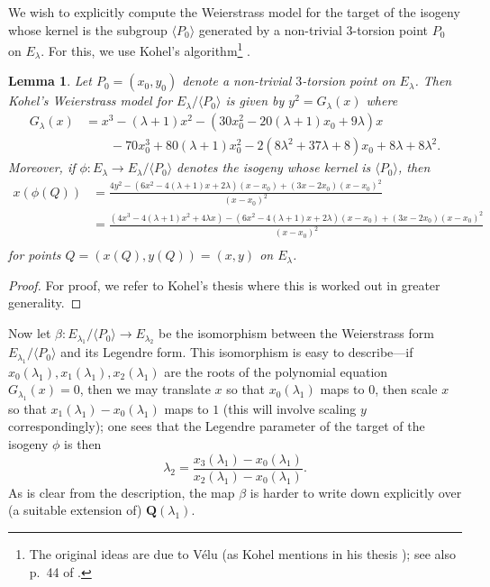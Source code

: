 \documentclass[11pt,a4paper]{article}
\newtheorem{lem}[defn]{Lemma}
\begin{document}
We wish to explicitly compute the Weierstrass model for the target of the isogeny whose kernel is the subgroup $\langle P_0 \rangle$ generated by a non-trivial $3$-torsion point $P_0$ on $E_\lambda$. For this, we use Kohel's algorithm\footnote{The original ideas are due to V\'elu \cite{V71} (as Kohel mentions in his thesis \cite{Koh96}); see also p.~44 of \cite{Elk98}.} \cite{Koh96}.

\begin{lem}
  Let $P_0 = (x_0, y_0)$ denote a non-trivial $3$-torsion point on $E_\lambda$. Then Kohel's Weierstrass model for $E_\lambda/\langle P_0 \rangle$ is given by $y^2 = G_\lambda(x)$ where 
  \begin{align*}
    G_\lambda(x) &= x^3 - (\lambda + 1)x^2 - (30x_0^2 -20(\lambda + 1)x_0 + 9\lambda) x \\
        &\qquad - 70x_0^3 + 80(\lambda + 1)x_0^2 - 2(8\lambda^2 + 37\lambda + 8)x_0 + 8\lambda + 8\lambda^2.
  \end{align*}
  Moreover, if $\phi: E_\lambda \to E_\lambda/\langle P_0 \rangle$ denotes the isogeny whose kernel is $\langle P_0 \rangle$, then
  \begin{align*}
    x(\phi(Q)) &= \frac{4y^2-(6x^2 - 4 (\lambda + 1)x + 2\lambda)(x-x_0) + (3x -2x_0)(x-x_0)^2}{(x-x_0)^2} \\
               &= \frac{(4x^3 - 4 (\lambda + 1) x^2 + 4 \lambda x)-(6x^2 - 4 (\lambda + 1)x + 2\lambda)(x-x_0) + (3x -2x_0)(x-x_0)^2}{(x-x_0)^2} \\
  \end{align*}
  for points $Q = (x(Q), y(Q)) = (x, y)$ on $E_\lambda$. 
\end{lem}
\begin{proof}
  For proof, we refer to Kohel's thesis \cite{Koh96} where this is worked out in greater generality. 
\end{proof}

Now let $\beta: E_{\lambda_1}/ \langle P_0 \rangle \to E_{\lambda_2}$ be the isomorphism between the Weierstrass form $E_{\lambda_1}/ \langle P_0 \rangle$ and its Legendre form. This isomorphism is easy to describe---if $x_0(\lambda_1), x_1(\lambda_1), x_2(\lambda_1)$ are the roots of the polynomial equation $G_{\lambda_1}(x) = 0$, then we may translate $x$ so that $x_0(\lambda_1)$ maps to $0$, then scale $x$ so that $x_1(\lambda_1) - x_0(\lambda_1)$ maps to $1$ (this will involve scaling $y$ correspondingly); one sees that the Legendre parameter of the target of the isogeny $\phi$ is then \[\lambda_2 = \frac{x_3(\lambda_1) - x_0(\lambda_1)}{x_2(\lambda_1) - x_0(\lambda_1)}.\] 
As is clear from the description, the map $\beta$ is harder to write down explicitly over (a suitable extension of) $\mathbf{Q}(\lambda_1)$. 
\end{document}
